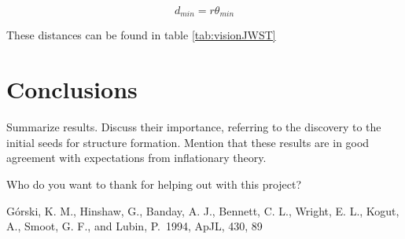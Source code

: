 \documentclass{emulateapj}
\begin{document}
\begin{equation}
d_{min} = r\theta_{min}
\end{equation}

These distances can be found in table \ref{tab:visionJWST}
\section{Conclusions}
\label{sec:conclusions}

Summarize results. Discuss their importance, referring to the
discovery to the initial seeds for structure formation. Mention that
these results are in good agreement with expectations from
inflationary theory.



%
%


%



\begin{acknowledgements}
  Who do you want to thank for helping out with this project?
\end{acknowledgements}

\begin{thebibliography}{}

 G{\'o}rski, K. M.,
  Hinshaw, G., Banday, A. J., Bennett, C. L., Wright, E. L., Kogut,
  A., Smoot, G. F., and Lubin, P.\ 1994, ApJL, 430, 89

\end{thebibliography}
\end{document}
